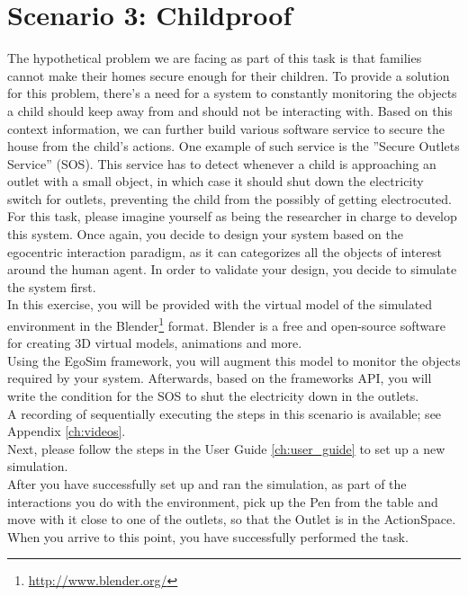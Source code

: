 \section{Scenario 3: Childproof} %
\label{sec:eval_childproof_scenario}
The hypothetical problem we are facing as part of this task is that families cannot make their homes secure enough for their children. To provide a solution for this problem, there's a need for a system to constantly monitoring the objects a child should keep away from and should not be interacting with. Based on this context information, we can further build various software service to secure the house from the child's actions. One example of such service is the ''Secure Outlets Service'' (SOS). This service has to detect whenever a child is approaching an outlet with a small object, in which case it should shut down the electricity switch for outlets, preventing the child from the possibly of getting electrocuted.\\

For this task, please imagine yourself as being the researcher in charge to develop this system. Once again, you decide to design your system based on the egocentric interaction paradigm, as it can categorizes all the objects of interest around the human agent. In order to validate your design, you decide to simulate the system first.\\

In this exercise, you will be provided with the virtual model of the simulated environment in the Blender\footnote{\url{http://www.blender.org/}} format. Blender is a free and open-source software for creating 3D virtual models, animations and more.\\

Using the EgoSim framework, you will augment this model to monitor the objects required by your system. Afterwards, based on the frameworks API, you will write the condition for the SOS to shut the electricity down in the outlets.\\

A recording of sequentially executing the steps in this scenario is available; see Appendix \ref{ch:videos}.\\

Next, please follow the steps in the User Guide \ref{ch:user_guide} to set up a new simulation.\\

After you have successfully set up and ran the simulation, as part of the interactions you do with the environment, pick up the Pen from the table and move with it close to one of the outlets, so that the Outlet is in the ActionSpace. When you arrive to this point, you have successfully performed the task.\\
